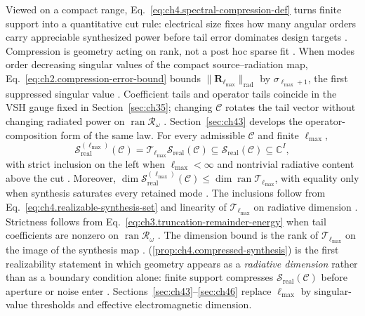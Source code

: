 Viewed on a compact range, Eq.~\eqref{eq:ch4.spectral-compression-def} turns finite support into a quantitative cut rule:
electrical size fixes how many angular orders carry appreciable synthesized power before tail error
dominates design targets \cite{stratton1941}. Compression is geometry acting on rank, not a
post hoc sparse fit \cite{harrington2001}.
When modes order decreasing singular values of the compact source--radiation map,
Eq.~\eqref{eq:ch2.compression-error-bound} bounds
\(\|\mathbf{R}_{\ell_{\max}}\|_{\mathrm{rad}}\) by \(\sigma_{\ell_{\max}+1}\), the first suppressed
singular value \cite{harrington2001}. Coefficient tails and operator tails coincide in the VSH gauge fixed
in Section~\ref{sec:ch35}; changing \(\mathcal{C}\) rotates the tail vector without changing radiated
power on \(\operatorname{ran}\mathcal{R}_\omega\) \cite{devaney2004}. Section~\ref{sec:ch43}
develops the operator-composition form of the same law.
\label{prop:ch4.compressed-synthesis}
For every admissible \(\mathcal{C}\) and finite \(\ell_{\max}\),
\begin{equation}
\label{eq:ch4.compressed-synthesis-set}
\mathcal{S}_{\mathrm{real}}^{(\ell_{\max})}(\mathcal{C})
=
\mathcal{T}_{\ell_{\max}}\mathcal{S}_{\mathrm{real}}(\mathcal{C})
\subseteq
\mathcal{S}_{\mathrm{real}}(\mathcal{C})
\subseteq
\mathbb{C}^{I},
\end{equation}
with strict inclusion on the left when \(\ell_{\max}<\infty\) and nontrivial radiative content above the cut
\cite{hansen1988}. Moreover,
\(\dim\mathcal{S}_{\mathrm{real}}^{(\ell_{\max})}(\mathcal{C})\le\dim\operatorname{ran}\mathcal{T}_{\ell_{\max}}\),
with equality only when synthesis saturates every retained mode \cite{harrington2001}.
The inclusions follow from Eq.~\eqref{eq:ch4.realizable-synthesis-set} and linearity of
\(\mathcal{T}_{\ell_{\max}}\) on radiative dimension \cite{stratton1941}. Strictness follows from
Eq.~\eqref{eq:ch3.truncation-remainder-energy} when tail coefficients are nonzero on
\(\operatorname{ran}\mathcal{R}_\omega\) \cite{hansen1988}. The dimension bound is the rank of
\(\mathcal{T}_{\ell_{\max}}\) on the image of the synthesis map \cite{harrington2001}.
(\ref{prop:ch4.compressed-synthesis}) is the first realizability statement in which geometry
appears as a \emph{radiative dimension} rather than as a boundary condition alone: finite support compresses
\(\mathcal{S}_{\mathrm{real}}(\mathcal{C})\) before aperture or noise enter
\cite{stratton1941}. Sections~\ref{sec:ch43}--\ref{sec:ch46} replace
\(\ell_{\max}\) by singular-value thresholds and effective electromagnetic dimension.
